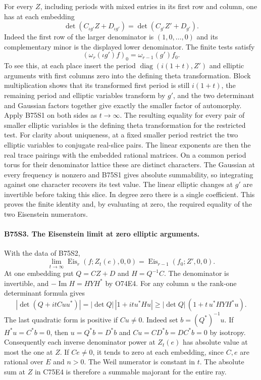 For every $Z$, including periods with mixed entries in its first row
and column, one has at each embedding
\[
     \det(C_{\iota g'}Z+D_{\iota g'})=\det(C_{g'}Z'+D_{g'}).
\]
Indeed the first row of the larger denominator is $(1,0,\ldots,0)$
and its complementary minor is the displayed lower denominator.
The finite tests satisfy
\[
      (\omega_r(\iota g')f)_0=\omega_{r-1}(g')f_0 .
\]
To see this, at each place insert the period
$\operatorname{diag}(i(1+t),Z')$ and elliptic arguments with first
columns zero into the defining theta transformation. Block
multiplication shows that its transformed first period is still
$i(1+t)$, the remaining period and elliptic variables transform by
$g'$, and the two determinant and Gaussian factors together give
exactly the smaller factor of automorphy. Apply B75S1 on both sides
as $t\to\infty$. The resulting equality for every pair of smaller
elliptic variables is the defining theta transformation for the
restricted test. For clarity about uniqueness, at a fixed smaller
period restrict the two elliptic variables to conjugate real-slice
pairs. The linear exponents are then the real trace pairings with
the embedded rational matrices. On a common period torus for their
denominator lattice these are distinct characters. The Gaussian at
every frequency is nonzero and B75S1 gives absolute summability,
so integrating against one character recovers its test value. The
linear elliptic changes at $g'$ are invertible before taking this
slice. In degree zero there is a single coefficient. This proves the
finite identity and, by evaluating at zero, the required equality of
the two Eisenstein numerators.

\paragraph{B75S3. The Eisenstein limit at zero elliptic arguments.}
With the data of B75S2,
\[
    \lim_{t\to\infty}\operatorname{Eis}_r(f;Z_t(e),0,0)
          =\operatorname{Eis}_{r-1}(f_0;Z',0,0).
\]
At one embedding put $Q=CZ+D$ and $H=Q^{-1}C$. The denominator
is invertible, and $-\operatorname{Im}H=HYH^*$ by O74E4. For
any column $u$ the rank-one determinant formula gives
\[
  |\det(Q+itCuu^*)|
    =|\det Q|\,|1+it u^*Hu|
    \ge |\det Q|\,(1+t\,u^*HYH^*u).
\]
The last quadratic form is positive if $Cu\ne0$. Indeed set
$b=(Q^*)^{-1}u$. If $H^*u=C^*b=0$, then
$u=Q^*b=D^*b$ and $Cu=CD^*b=DC^*b=0$ by isotropy.
Consequently each inverse denominator power at $Z_t(e)$ has absolute
value at most the one at $Z$. If $Ce\ne0$, it tends to zero at each
embedding, since $C,e$ are rational over $E$ and $n>0$.
The Weil numerator is constant in $t$. The absolute sum at $Z$ in
C75E4 is therefore a summable majorant for the entire ray.


